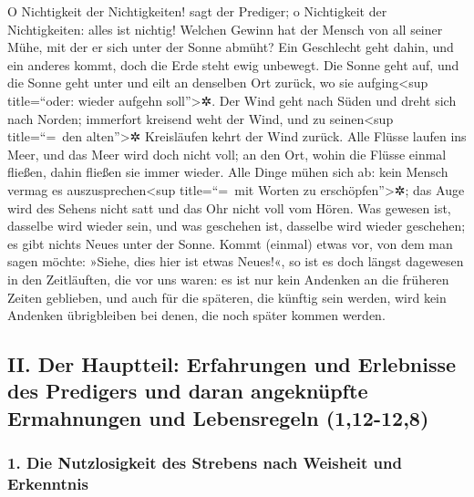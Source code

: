 O Nichtigkeit der Nichtigkeiten! sagt der Prediger; o
Nichtigkeit der Nichtigkeiten: alles ist nichtig! Welchen
Gewinn hat der Mensch von all seiner Mühe, mit der er sich unter der
Sonne abmüht? Ein Geschlecht geht dahin, und ein anderes
kommt, doch die Erde steht ewig unbewegt. Die Sonne geht
auf, und die Sonne geht unter und eilt an denselben Ort zurück, wo sie
aufging\textless sup title=``oder: wieder aufgehn soll''\textgreater✲.
Der Wind geht nach Süden und dreht sich nach Norden;
immerfort kreisend weht der Wind, und zu seinen\textless sup
title=``=~den alten''\textgreater✲ Kreisläufen kehrt der Wind zurück.
Alle Flüsse laufen ins Meer, und das Meer wird doch nicht
voll; an den Ort, wohin die Flüsse einmal fließen, dahin fließen sie
immer wieder. Alle Dinge mühen sich ab: kein Mensch vermag
es auszusprechen\textless sup title=``=~mit Worten zu
erschöpfen''\textgreater✲; das Auge wird des Sehens nicht satt und das
Ohr nicht voll vom Hören. Was gewesen ist, dasselbe wird
wieder sein, und was geschehen ist, dasselbe wird wieder geschehen; es
gibt nichts Neues unter der Sonne. Kommt (einmal) etwas
vor, von dem man sagen möchte: »Siehe, dies hier ist etwas Neues!«, so
ist es doch längst dagewesen in den Zeitläuften, die vor uns waren:
es ist nur kein Andenken an die früheren Zeiten
geblieben, und auch für die späteren, die künftig sein werden, wird kein
Andenken übrigbleiben bei denen, die noch später kommen werden.

\hypertarget{ii.-der-hauptteil-erfahrungen-und-erlebnisse-des-predigers-und-daran-angeknuxfcpfte-ermahnungen-und-lebensregeln-112-128}{%
\subsection{II. Der Hauptteil: Erfahrungen und Erlebnisse des Predigers
und daran angeknüpfte Ermahnungen und Lebensregeln
(1,12-12,8)}\label{ii.-der-hauptteil-erfahrungen-und-erlebnisse-des-predigers-und-daran-angeknuxfcpfte-ermahnungen-und-lebensregeln-112-128}}

\hypertarget{die-nutzlosigkeit-des-strebens-nach-weisheit-und-erkenntnis}{%
\subsubsection{1. Die Nutzlosigkeit des Strebens nach Weisheit und
Erkenntnis}\label{die-nutzlosigkeit-des-strebens-nach-weisheit-und-erkenntnis}}

